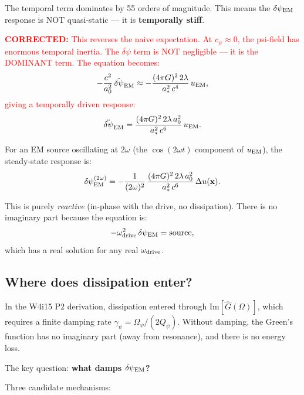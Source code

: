 \documentclass[11pt]{article}
\newcommand{\Qpsi}{Q_\psi}
\newcommand{\Opsi}{\Omega_\psi}
\newcommand{\gpsi}{\gamma_\psi}
\newcommand{\dpsiEM}{\delta\psi_{\rm EM}}
\newcommand{\corrected}[1]{\textcolor{red}{\textbf{CORRECTED:} #1}}
\theoremstyle{definition}
\theoremstyle{remark}
\begin{document}
The temporal term dominates by 55 orders of magnitude. This means
the $\dpsiEM$ response is NOT quasi-static --- it is
\textbf{temporally stiff}.

\corrected{This reverses the naive expectation. At $c_\psi
\approx 0$, the psi-field has enormous temporal inertia. The
$\ddot{\delta\psi}$ term is NOT negligible --- it is the DOMINANT
term. The equation becomes:
\begin{equation}
-\frac{c^2}{a_0^2}\,\ddot{\delta\psi}_{\rm EM}
\approx -\frac{(4\pi G)^2\,2\lambda}{a_*^2\,c^4}\,u_{\rm EM},
\end{equation}
giving a temporally driven response:
\begin{equation}
\ddot{\delta\psi}_{\rm EM}
= \frac{(4\pi G)^2\,2\lambda\,a_0^2}{a_*^2\,c^6}\,u_{\rm EM}.
\end{equation}}

For an EM source oscillating at $2\omega$ (the $\cos(2\omega t)$
component of $u_{\rm EM}$), the steady-state response is:
\begin{equation}
\dpsiEM^{(2\omega)} = -\frac{1}{(2\omega)^2}\,
\frac{(4\pi G)^2\,2\lambda\,a_0^2}{a_*^2\,c^6}\,
\Delta u(\mathbf{x}).
\label{eq:dpsi-response}
\end{equation}

This is purely \emph{reactive} (in-phase with the drive, no
dissipation). There is no imaginary part because the equation
is:
\begin{equation}
-\omega_{\rm drive}^2\,\dpsiEM = \text{source},
\end{equation}
which has a real solution for any real $\omega_{\rm drive}$.

\subsection{Where does dissipation enter?}

In the W4i15 P2 derivation, dissipation entered through
Im$[\hat{G}(\Omega)]$, which requires a finite damping rate
$\gpsi = \Opsi/(2\Qpsi)$. Without damping, the Green's function
has no imaginary part (away from resonance), and there is no energy
loss.

The key question: \textbf{what damps $\dpsiEM$?}

Three candidate mechanisms:
\end{document}
